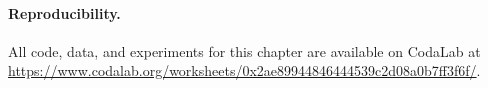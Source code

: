 \paragraph{Reproducibility.}
All code, data, and experiments for this chapter are available on CodaLab at
{\small \url{https://www.codalab.org/worksheets/0x2ae89944846444539c2d08a0b7ff3f6f/}}.





